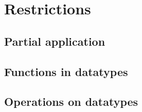 
\section{Restrictions} \label{chapter:restrictions}


\subsection{Partial application}
\subsection{Functions in datatypes}
\subsection{Operations on datatypes} \label{chapter:nonconstant_zeros}
